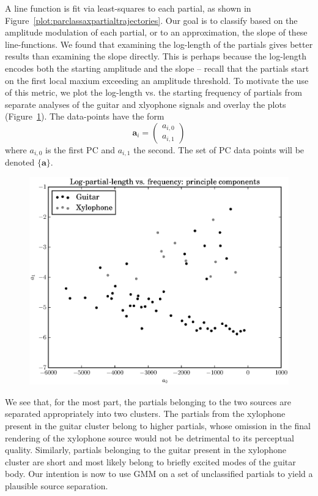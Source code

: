 A line function is fit via least-squares to each partial, as shown in
Figure~\ref{plot:parclassaxpartialtrajectories}. Our goal is to classify based
on the amplitude modulation of each partial, or to an approximation, the slope of these line-functions. We found that examining the log-length of the
partials gives better results than examining the slope directly. This is perhaps
because the log-length encodes both the starting amplitude and the slope -- recall
that the partials start on the first local maxium exceeding an amplitude
threshold. To motivate the use of this metric, we plot the log-length vs. the
starting frequency of
partials from separate analyses of the guitar and xlyophone signals and overlay
the plots (Figure~\ref{plot:partialclassificationacgtrxyloseptruememberships}).
The data-points have the form
\[
    \boldsymbol{a}_i = \begin{pmatrix}
        a_{i,0} \\
        a_{i,1}
    \end{pmatrix}
\]
where $a_{i,0}$ is the first PC and $a_{i,1}$ the second. The set of PC data
points will be denoted $\{\boldsymbol{a}\}$.
\begin{figure}
    \includegraphics[width=\textwidth]{plots/partial_classification_acgtr_xylo_sep_true_memberships.eps}
    \caption{\label{plot:partialclassificationacgtrxyloseptruememberships}}
\end{figure}
We see that, for the most part, the partials belonging to the two sources are
separated appropriately into two clusters. The partials from the xylophone
present in the guitar cluster belong to higher partials, whose omission in the
final rendering of the xylophone source would not be detrimental to its
perceptual quality. Similarly, partials belonging to the guitar present in the
xylophone cluster are short and most likely belong to briefly excited modes
of the guitar body. Our intention is now to use GMM on a set of unclassified
partials to yield a plausible source separation.


